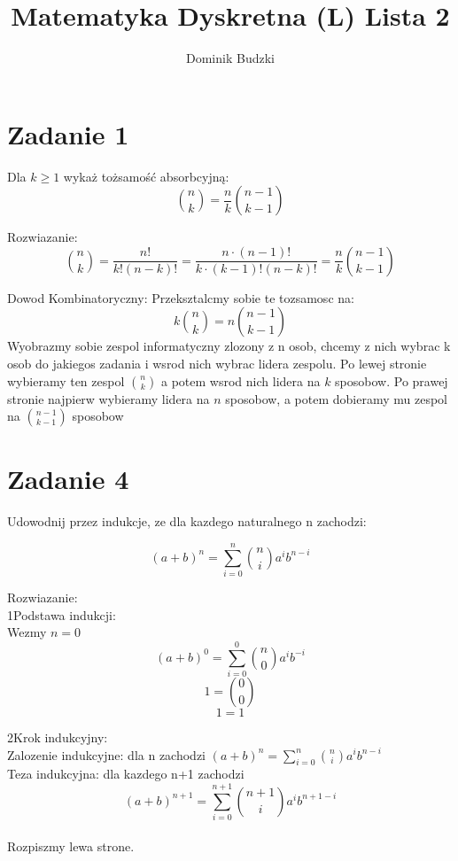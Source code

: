 \documentclass{article}
\title{Matematyka Dyskretna (L) Lista 2}
\author{Dominik Budzki}
\begin{document}
\maketitle

\section{Zadanie 1}
Dla $k \geq 1$ wykaż tożsamość absorbcyjną:\\
$${{n}\choose{k}} = \frac{n}{k} {{n-1}\choose{k-1}}$$

Rozwiazanie:\\

$${{n}\choose{k}} = \frac{n!}{k!(n-k)!} = \frac{n\cdot(n-1)!}{k\cdot(k-1)!(n-k)!} = \frac{n}{k}{{n-1}\choose{k-1}}$$

Dowod Kombinatoryczny:
Przeksztalcmy sobie te tozsamosc na:
$$k{{n}\choose{k}} = n{{n-1}\choose{k-1}}$$
Wyobrazmy sobie zespol informatyczny zlozony z n osob, chcemy z nich wybrac k osob do jakiegos zadania i wsrod nich wybrac lidera zespolu.
Po lewej stronie wybieramy ten zespol ${n}\choose{k}$ a potem wsrod nich lidera na $k$ sposobow.
Po prawej stronie najpierw wybieramy lidera na $n$ sposobow, a potem dobieramy mu zespol na ${n-1}\choose{k-1}$ sposobow

\newpage
\section{Zadanie 4}
Udowodnij przez indukcje, ze dla kazdego naturalnego n zachodzi:

$$(a+b)^n = \sum_{i=0}^n {{n}\choose{i}} a^i b^{n-i}$$

Rozwiazanie:\\

1\degree  Podstawa indukcji:\\

Wezmy $n = 0$ \\

$$(a+b)^0 = \sum_{i=0}^0 {{n}\choose{0}} a^i b^{-i}$$
$$1 = {{0}\choose{0}}$$
$$1 = 1$$

2\degree  Krok indukcyjny:\\
Zalozenie indukcyjne: dla n zachodzi $(a+b)^n = \sum_{i=0}^n {{n}\choose{i}} a^i b^{n-i}$ \\
Teza indukcyjna: dla kazdego n+1 zachodzi $$(a+b)^{n+1} = \sum_{i=0}^{n+1} {{n+1}\choose{i}} a^i b^{n+1-i}$$ \\

Rozpiszmy lewa strone.
\end{document}
